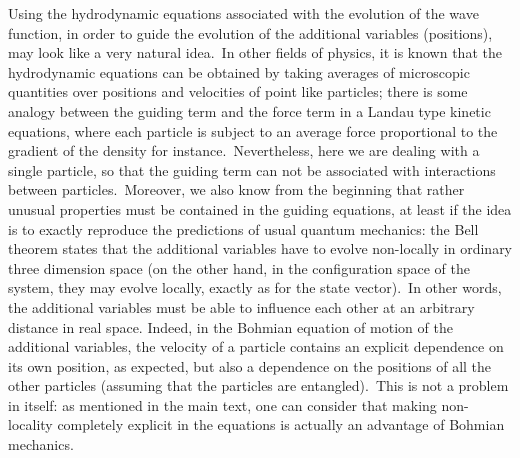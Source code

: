 \documentclass[12pt,onecolumn]{article}%
\begin{document}
Using the hydrodynamic equations associated with the evolution of the wave
function, in order to guide the evolution of the additional variables
(positions), may look like a very natural idea.\ In other fields of physics,
it is known that the hydrodynamic equations can be obtained by taking averages
of microscopic quantities over positions and velocities of point like
particles; there is some analogy between the guiding term and the force term
in a Landau type kinetic equations, where each particle is subject to an
average force proportional to the gradient of the density for
instance.\ Nevertheless, here we are dealing with a single particle, so that
the guiding term can not be associated with interactions between
particles.\ Moreover, we also know from the beginning that rather unusual
properties must be contained in the guiding equations, at least if the idea is
to exactly reproduce the predictions of usual quantum mechanics: the Bell
theorem states that the additional variables have to evolve non-locally in
ordinary three dimension space (on the other hand, in the configuration space
of the system, they may evolve locally, exactly as for the state vector).\ In
other words, the additional variables must be able to influence each other at
an arbitrary distance in real space. Indeed, in the Bohmian equation of motion
of the additional variables, the velocity of a particle contains an explicit
dependence on its own position, as expected, but also a dependence on the
positions of all the other particles (assuming that the particles are
entangled).\ This is not a problem in itself: as mentioned in the main text,
one can consider that making non-locality completely explicit in the equations
is actually an advantage of Bohmian mechanics.
\end{document}
